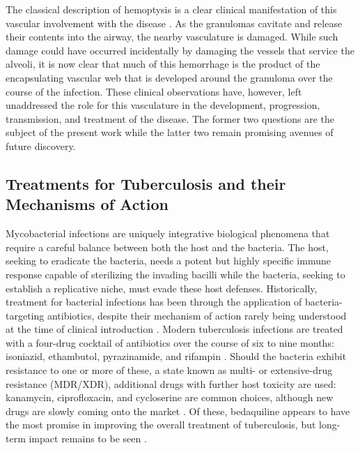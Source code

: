 The classical description of hemoptysis is a clear clinical manifestation of this vascular involvement with the disease \citep{Middleton1977, Souders1952, Turner2003a, Turner2003b}. As the granulomas cavitate and release their contents into the airway, the nearby vasculature is damaged. While such damage could have occurred incidentally by damaging the vessels that service the alveoli, it is now clear that much of this hemorrhage is the product of the encapsulating vascular web that is developed around the granuloma over the course of the infection. These clinical observations have, however, left unaddressed the role for this vasculature in the development, progression, transmission, and treatment of the disease. The former two questions are the subject of the present work while the latter two remain promising avenues of future discovery.

\subsection{Treatments for Tuberculosis and their Mechanisms of Action}\label{treatments}

Mycobacterial infections are uniquely integrative biological phenomena that require a careful balance between both the host and the bacteria. The host, seeking to eradicate the bacteria, needs a potent but highly specific immune response capable of sterilizing the invading bacilli while the bacteria, seeking to establish a replicative niche, must evade these host defenses. Historically, treatment for bacterial infections has been through the application of bacteria-targeting antibiotics, despite their mechanism of action rarely being understood at the time of clinical introduction \citep{DAmbrosio2015, Osborne2013}. Modern tuberculosis infections are treated with a four-drug cocktail of antibiotics over the course of six to nine months: isoniazid, ethambutol, pyrazinamide, and rifampin \citep{Dorman2021, Grace2019}. Should the bacteria exhibit resistance to one or more of these, a state known as multi- or extensive-drug resistance (MDR/XDR), additional drugs with further host toxicity are used: kanamycin, ciprofloxacin, and cycloserine are common choices, although new drugs are slowly coming onto the market \citep{Quenard2017, Jang2020, Nahid2019}. Of these, bedaquiline appears to have the most promise in improving the overall treatment of tuberculosis, but long-term impact remains to be seen \citep{Mahajan2013, Pym2016, Furin2017}. 

